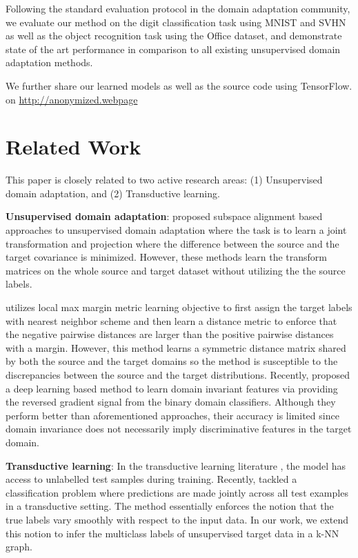 \documentclass{article}
\begin{document}
Following the standard evaluation protocol in the domain adaptation community, we evaluate our method on the digit classification task using MNIST \cite{mnist} and SVHN\cite{svhn} as well as the object recognition task using the Office \cite{office} dataset, and demonstrate state of the art performance in comparison to all existing unsupervised domain adaptation methods. 

We further share our learned models as well as the source code using TensorFlow\cite{tensorflow}. on \url{http://anonymized.webpage}

\section{Related Work} 

This paper is closely related to two active research areas: (1) Unsupervised domain adaptation, and (2) Transductive learning.

\textbf{Unsupervised domain adaptation}: \cite{gong12, baochen15, fernando13, baochen16} proposed subspace alignment based approaches to unsupervised domain adaptation where the task is to learn a joint transformation and projection where the difference between the source and the target covariance is minimized. However, these methods learn the transform matrices on the whole source and target dataset without utilizing the the source labels. 

\cite{tommasi13} utilizes local max margin metric learning objective \cite{lmnn} to first assign the target labels with nearest neighbor scheme and then learn a distance metric to enforce that the negative pairwise distances are larger than the positive pairwise distances with a margin. However, this method learns a symmetric distance matrix shared by both the source and the target domains so the method is susceptible to the discrepancies between the source and the target distributions. Recently, \cite{ganin15, tzeng14} proposed a deep learning based method to learn domain invariant features via providing the reversed gradient signal from the binary domain classifiers. Although they perform better than aforementioned approaches, their accuracy is limited since domain invariance does not necessarily imply discriminative features in the target domain. 

\textbf{Transductive learning}: In the transductive learning literature \cite{transduction}, the model has access to unlabelled test samples during training. Recently, \cite{coclassification} tackled a classification problem where predictions are made jointly across all test examples in a transductive \cite{transduction} setting. The method essentially enforces the notion that the true labels vary smoothly with respect to the input data. In our work, we extend this notion to infer the multiclass labels of unsupervised target data in a k-NN graph. 
\end{document}
